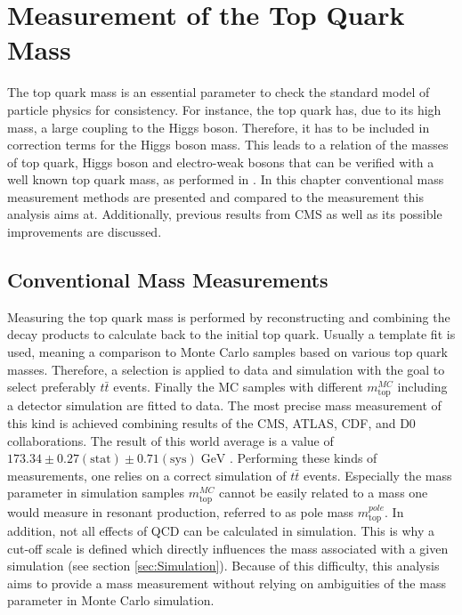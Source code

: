 \chapter{Measurement of the Top Quark Mass}
	The top quark mass is an essential parameter to check the standard model of particle physics for consistency. For instance, the top quark has, due to its high mass, a large coupling to the Higgs boson. Therefore, it has to be included in correction terms for the Higgs boson mass. This leads to a relation of the masses of top quark, Higgs boson and electro-weak bosons that can be verified with a well known top quark mass, as performed in \cite{ewfit}. In this chapter conventional mass measurement methods are presented and compared to the measurement this analysis aims at. Additionally, previous results from CMS as well as its possible improvements are discussed. 
	
\section{Conventional Mass Measurements}
	Measuring the top quark mass is performed by reconstructing and combining the decay products to calculate back to the initial top quark. Usually a template  fit is used, meaning a comparison to Monte Carlo samples based on various top quark masses. Therefore, a selection is applied to data and simulation with the goal to select preferably $t\bar{t}$ events. Finally the MC samples with different $m_\text{top}^{MC}$ including a detector simulation are fitted to data. The most precise mass measurement of this kind is achieved combining results of the CMS, ATLAS, CDF, and D0 collaborations. The result of this world average is a value of $173.34 \pm 0.27 (\text{stat}) \pm 0.71 (\text{sys})\;\text{GeV}$ \cite{topmass_combination}. Performing these kinds of measurements, one relies on a correct simulation of $t\bar{t}$ events. Especially the mass parameter in simulation samples $m_\text{top}^{MC}$ cannot be easily related to a mass one would measure in resonant production, referred to as pole mass $m_\text{top}^{pole}$. In addition, not all effects of QCD can be calculated \cite{nonperturbative} in simulation. This is why a cut-off \cite{cutoff} scale is defined which directly influences the mass associated with a given simulation (see section \ref{sec:Simulation}). Because of this difficulty, this analysis aims to provide a mass measurement without relying on ambiguities of the mass parameter in Monte Carlo simulation.

